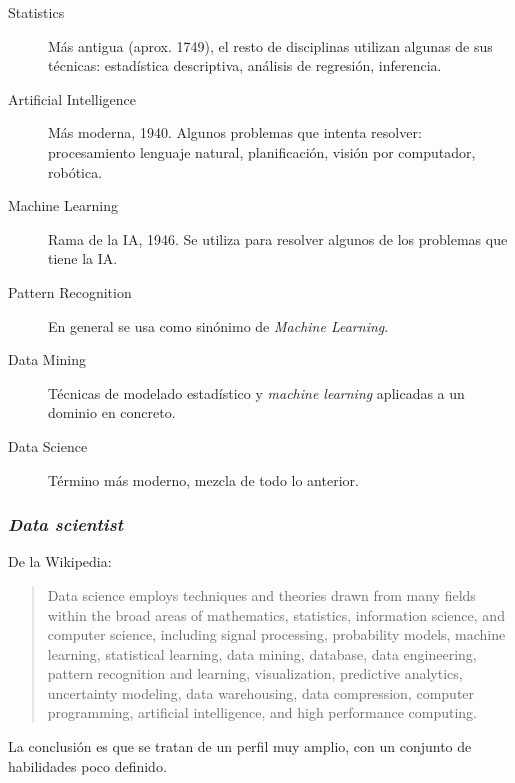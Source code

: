 \documentclass{beamer}
\begin{document}
\begin{frame}[plain]
\begin{description}
\item[Statistics] Más antigua (aprox. 1749), el resto de disciplinas utilizan algunas de sus técnicas: estadística descriptiva, análisis de regresión, inferencia.
\item[Artificial Intelligence] Más moderna, 1940. Algunos problemas que intenta resolver: procesamiento lenguaje natural, planificación, visión por computador, robótica.
\item[Machine Learning] Rama de la IA, 1946. Se utiliza para resolver algunos de los problemas que tiene la IA.
\item[Pattern Recognition] En general se usa como sinónimo de \textit{Machine Learning}.
\item[Data Mining] Técnicas de modelado estadístico y \textit{machine learning} aplicadas a un dominio en concreto.
\item[Data Science] Término más moderno, mezcla de todo lo anterior.
\end{description}
\end{frame}

\begin{frame}
\frametitle{\textit{Data scientist}}

De la Wikipedia:
\begin{quote}
Data science employs techniques and theories drawn from many fields within the broad areas of mathematics, statistics, information science, and computer science, including signal processing, probability models, machine learning, statistical learning, data mining, database, data engineering, pattern recognition and learning, visualization, predictive analytics, uncertainty modeling, data warehousing, data compression, computer programming, artificial intelligence, and high performance computing.
\end{quote}

La conclusión es que se tratan de un perfil muy amplio, con un conjunto de habilidades poco definido.
\end{frame}
\end{document}

